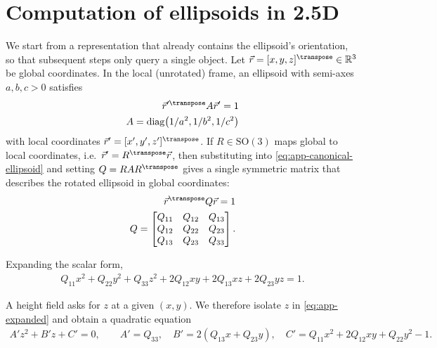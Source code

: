 \chapter{Computation of ellipsoids in 2.5D}
\label{app:ellipsoid-matrix}


We start from a representation that already contains the ellipsoid’s orientation, so that subsequent steps only query a single object. Let $\vec r=[x,y,z]^\transpose \in\mathbb{R}^3$ be global coordinates. In the local (unrotated) frame, an ellipsoid with semi-axes $a,b,c>0$ satisfies
\begin{align}
    \label{eq:app-canonical-ellipsoid}
    \vec r'^\transpose  A \vec r' = 1 \\
    A=\operatorname{diag}\!\left(1/a^2, 1/b^2, 1/c^2\right)
\end{align}
with local coordinates $\vec r'=[x',y',z']^\transpose $. If $R\in \mathrm{SO}(3)$ maps global to local coordinates, i.e.\ $\vec r'=R^\transpose \vec r$, then substituting into \cref{eq:app-canonical-ellipsoid} and setting $Q=RAR^\transpose $ gives a single symmetric matrix that describes the rotated ellipsoid in global coordinates:
\begin{align}
    \label{eq:app-global-implicit}
    \vec r^\transpose  Q \vec r = 1 \\
    Q =
    \begin{bmatrix}
        Q_{11} & Q_{12} & Q_{13}\\
        Q_{12} & Q_{22} & Q_{23}\\
        Q_{13} & Q_{23} & Q_{33}
    \end{bmatrix}.
\end{align}

Expanding the scalar form,
\begin{align}
    \label{eq:app-expanded}
    Q_{11}x^2 + Q_{22}y^2 + Q_{33}z^2 + 2Q_{12}xy + 2Q_{13}xz + 2Q_{23}yz = 1.
\end{align}

A height field asks for $z$ at a given $(x,y)$. We therefore isolate $z$ in \cref{eq:app-expanded} and obtain a quadratic equation
\begin{align}
    \label{eq:app-quadratic-coeffs}
    A' z^2 + B' z + C' = 0,
    \qquad
    A' = Q_{33},\quad
    B' = 2(Q_{13}x + Q_{23}y),\quad
    C' = Q_{11}x^2 + 2Q_{12}xy + Q_{22}y^2 - 1.
\end{align}

